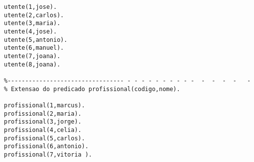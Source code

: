 \documentclass[pdftex,12pt,a4paper]{report}
\begin{document}
\begin{appendices}
\begin{Verbatim}
utente(1,jose).  
utente(2,carlos). 
utente(3,maria). 
utente(4,jose).   
utente(5,antonio). 
utente(6,manuel).  
utente(7,joana).
utente(8,joana).  

%--------------------------------- - - - - - - - - - -  -  -  -  -   -
% Extensao do predicado profissional(codigo,nome).

profissional(1,marcus).
profissional(2,maria).
profissional(3,jorge).
profissional(4,celia).
profissional(5,carlos).
profissional(6,antonio).
profissional(7,vitoria ).





\end{Verbatim}

\end{appendices}
\end{document}
